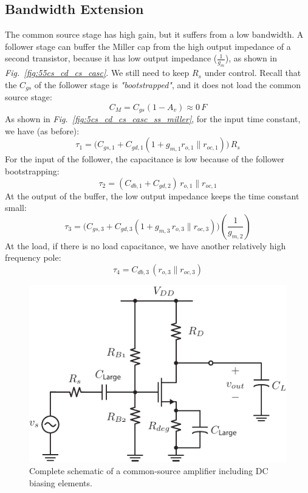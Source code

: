 \subsection{Bandwidth Extension}
The common source stage has high gain, but it suffers from a low bandwidth.  A follower stage can buffer the Miller cap from the high output impedance of a second transistor, because it has low output impedance ($\frac{1}{g_m}$), as shown in \emph{Fig.~\ref{fig:55cs_cd_cs_casc}}.  We still need to keep $R_s$ under control.  Recall that the $C_{gs}$ of the follower stage is \textit{"bootstrapped"}, and it does not load the common source stage:
    \begin{equation}
    	C_M = C_{gs} (1 - A_v) \approx 0\,F
    \end{equation}
As shown in \emph{Fig.~\ref{fig:5cs_cd_cs_casc_ss_miller}}, for the input time constant, we have (as before):   
    \begin{equation} 
        \tau_1 = \Big(C_{gs,1} + C_{gd,1} (1 + g_{m,1} r_{o,1} \parallel r_{oc,1})\Big)\,R_s
    \end{equation}
For the input of the follower, the capacitance is low because of the follower bootstrapping:
    \begin{equation} 
        \tau_2 = (C_{db,1} + C_{gd,2})\,r_{o,1} \parallel r_{oc,1}
    \end{equation}
At the output of the buffer, the low output impedance keeps the time constant small:
    \begin{equation}  
        \tau_3 = \Big(C_{gs,3} + C_{gd,3} (1 + g_{m,3}\,r_{o,3} \parallel r_{oc,3})\Big)\left(\frac{1}{g_{m,2}}\right)
    \end{equation}
At the load, if there is no load capacitance, we have another relatively high frequency pole:
    \begin{equation}  
        \tau_4 = C_{db,3}\,(r_{o,3} \parallel r_{oc,3})
    \end{equation}
\newpage
\begin{figure}[tb]
\centering
\includegraphics[scale=1.35]{6cs_dc}
\caption{Complete schematic of a common-source amplifier including DC biasing elements.}
\label{fig:6cs_dc}
\end{figure}
